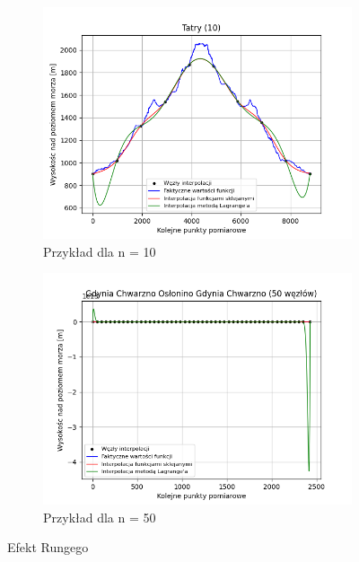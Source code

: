 \documentclass[fleqn]{article}
\begin{document}
    \begin{figure}[h]
        \centering
        \begin{subfigure}{.5\textwidth}
          \centering
          \includegraphics[width=\linewidth]{plot_10_points_Tatry.png}
          \caption{Przykład dla n = 10}
          \label{fig:sub1}
        \end{subfigure}%
        \begin{subfigure}{.5\textwidth}
          \centering
          \includegraphics[width=\linewidth]{efektRungego.png}
          \caption{Przykład dla n = 50}
          \label{fig:sub2}
        \end{subfigure}
        \caption{Efekt Rungego}
        \label{fig:test}
    \end{figure}
\end{document}
